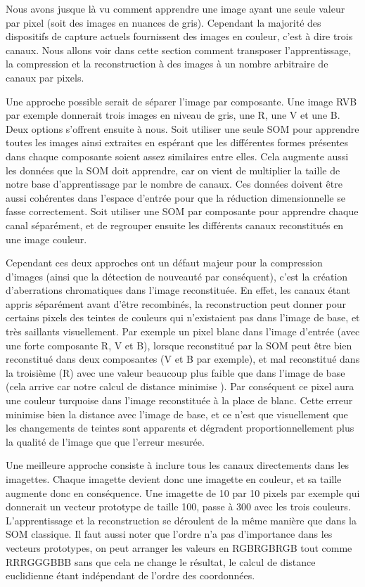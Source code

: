 	Nous avons jusque là vu comment apprendre une image ayant une seule valeur par pixel (soit des images en nuances de gris). Cependant la majorité des dispositifs de capture actuels fournissent des images en couleur, c'est à dire trois canaux. Nous allons voir dans cette section comment transposer l'apprentissage, la compression et la reconstruction à des images à un nombre arbitraire de canaux par pixels.

	Une approche possible serait de séparer l'image par composante. Une image RVB par exemple donnerait trois images en niveau de gris, une R, une V et une B. Deux options s'offrent ensuite à nous. Soit utiliser une seule SOM pour apprendre toutes les images ainsi extraites en espérant que les différentes formes présentes dans chaque composante soient assez similaires entre elles. Cela augmente aussi les données que la SOM doit apprendre, car on vient de multiplier la taille de notre base d'apprentissage par le nombre de canaux. Ces données doivent être aussi cohérentes dans l'espace d'entrée pour que la réduction dimensionnelle se fasse correctement. Soit utiliser une SOM par composante pour apprendre chaque canal séparément, et de regrouper ensuite les différents canaux reconstitués en une image couleur. 
	
	Cependant ces deux approches ont un défaut majeur pour la compression d'images (ainsi que la détection de nouveauté par conséquent), c'est la création d'aberrations chromatiques dans l'image reconstituée. En effet, les canaux étant appris séparément avant d'être recombinés, la reconstruction peut donner pour certains pixels des teintes de couleurs qui n'existaient pas dans l'image de base, et très saillants visuellement. Par exemple un pixel blanc dans l'image d'entrée (avec une forte composante R, V et B), lorsque reconstitué par la SOM peut être bien reconstitué dans deux composantes (V et B par exemple), et mal reconstitué dans la troisième (R) avec une valeur beaucoup plus faible que dans l'image de base (cela arrive car notre calcul de distance minimise ). Par conséquent ce pixel aura une couleur turquoise dans l'image reconstituée à la place de blanc. Cette erreur minimise bien la distance avec l'image de base, et ce n'est que visuellement que les changements de teintes sont apparents et dégradent proportionnellement plus la qualité de l'image que que l'erreur mesurée.

	Une meilleure approche consiste à inclure tous les canaux directements dans les imagettes. Chaque imagette devient donc une imagette en couleur, et sa taille augmente donc en conséquence. Une imagette de 10 par 10 pixels par exemple qui donnerait un vecteur prototype de taille 100, passe à 300 avec les trois couleurs. L'apprentissage et la reconstruction se déroulent de la même manière que dans la SOM classique. Il faut aussi noter que l'ordre n'a pas d'importance dans les vecteurs prototypes, on peut arranger les valeurs en RGBRGBRGB tout comme RRRGGGBBB sans que cela ne change le résultat, le calcul de distance euclidienne étant indépendant de l'ordre des coordonnées.

